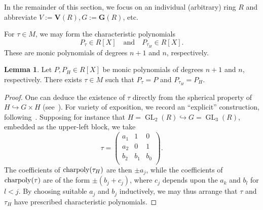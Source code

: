 \documentclass[reqno]{amsart}
\DeclarePairedDelimiter{\paren}{(}{)}
\newcommand{\Of}[2]{{\operatorname{#1}} {\paren*{#2}}}
\DeclareMathOperator{\GL}{GL}
\theoremstyle{plain} \newtheorem{theorem} {Theorem} \newtheorem{conjecture} {Conjecture} \newtheorem{corollary} [theorem] {Corollary} \newtheorem{proposition} [theorem] {Proposition} \newtheorem{fact} [theorem] {Fact}
\theoremstyle{definition} \newtheorem{definition} [theorem] {Definition}
\theoremstyle{itplain} %
\newtheorem{lemma}[theorem]{Lemma}
\begin{document}
In the remainder of this section, we focus on an individual (arbitrary) ring $R$ and abbreviate $V := \mathbf{V}(R), G := \mathbf{G}(R)$, etc.

For $\tau \in M$, we may form the characteristic polynomials
\begin{equation*}
  P_\tau \in R[X] \quad \text{and} \quad P_{\tau_H} \in R[X].
\end{equation*}
These are monic polynomials of degrees $n+1$ and $n$, respectively.

\begin{lemma}\label{lemma:let-p-p_h-in-rx-be-monic-polyn-degr-n+1-n-resp-the}
  Let $P, P_H \in R[X]$ be monic polynomials of degrees $n+1$ and $n$, respectively.  There exists $\tau \in M$ such that $P_{\tau} = P$ and $P_{\tau_H} = P_H$.
\end{lemma}
\begin{proof}
  One can deduce the existence of $\tau$ directly from the spherical property of $H \hookrightarrow G \times H$ (see~\cite[\S14.6]{nelson-venkatesh-1}).  For variety of exposition, we record an ``explicit'' construction, following~\cite[\S6.2]{MR3164988}.  Supposing for instance that $H = \GL_2(R) \hookrightarrow G = \GL_3(R)$, embedded as the upper-left block, we take
  \begin{equation*}
    \tau =
    \begin{pmatrix}
      a _1  & 1 & 0 \\
      a _2 & 0 & 1 \\
      b _2  & b _1  & b _0  \\
    \end{pmatrix}.
  \end{equation*}
  The coefficients of $\Of{charpoly}{\tau_H}$ are then $\pm a_j$, while the coefficients of $\Of{charpoly}{\tau}$ are of the form $\pm (b_j + c_j)$, where $c_j$ depends upon the $a_k$ and $b_l$ for $l<j$. By choosing suitable $a_j$ and $b_j$ inductively, we may thus arrange that $\tau$ and $\tau_H$ have prescribed characteristic polynomials.
\end{proof}
\end{document}
